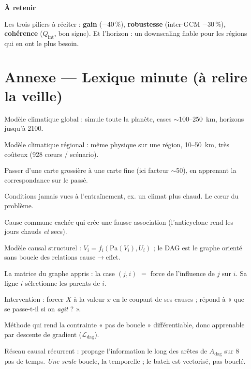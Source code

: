 \documentclass[11pt,a4paper]{article}
\newcommand{\Adag}{\ensuremath{A_{\mathrm{dag}}}}
\newcommand{\bloc}[1]{\par\medskip\noindent\textcolor{accent}{\textbf{#1}}\par\nopagebreak\smallskip}
\begin{document}
\bloc{À retenir}
Les trois piliers à réciter : \textbf{gain} ($-40\,\%$), \textbf{robustesse} (inter-GCM $-30\,\%$), \textbf{cohérence} ($Q_{\mathrm{int}}$, bon signe). Et l'horizon : un downscaling fiable pour les régions qui en ont le plus besoin.

\section*{Annexe --- Lexique minute (à relire la veille)}

\begin{description}[style=nextline,nosep]
  \item[GCM] Modèle climatique global : simule toute la planète, cases $\sim$100--250~km, horizons jusqu'à 2100.
  \item[RCM] Modèle climatique régional : même physique sur une région, 10--50~km, très coûteux (928 c\oe urs / scénario).
  \item[Downscaling] Passer d'une carte grossière à une carte fine (ici facteur $\sim$50), en apprenant la correspondance sur le passé.
  \item[OOD (hors distribution)] Conditions jamais vues à l'entraînement, ex. un climat plus chaud. Le c\oe ur du problème.
  \item[Confondant] Cause commune cachée qui crée une fausse association (l'anticyclone rend les jours chauds \emph{et} secs).
  \item[SCM / DAG] Modèle causal structurel : $V_i=f_i(\mathrm{Pa}(V_i),U_i)$ ; le DAG est le graphe orienté sans boucle des relations cause$\to$effet.
  \item[\Adag{}] La matrice du graphe appris : la case $(j,i)$ $=$ force de l'influence de $j$ sur $i$. Sa ligne $i$ sélectionne les parents de $i$.
  \item[$\mathrm{do}(X=x)$] Intervention : forcer $X$ à la valeur $x$ en le coupant de ses causes ; répond à « que se passe-t-il si on \emph{agit} ? ».
  \item[DAGMA] Méthode qui rend la contrainte « pas de boucle » différentiable, donc apprenable par descente de gradient ($\mathcal{L}_{\mathrm{dag}}$).
  \item[RCN] Réseau causal récurrent : propage l'information le long des arêtes de \Adag{} sur 8 pas de temps. \emph{Une seule} boucle, la temporelle ; le batch est vectorisé, pas bouclé.

\end{description}
\end{document}
